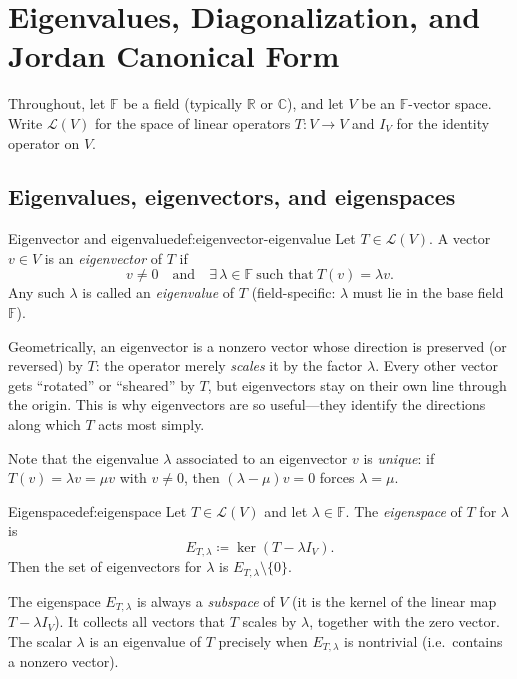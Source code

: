 \section{Eigenvalues, Diagonalization, and Jordan Canonical Form}

Throughout, let $\mathbb{F}$ be a field (typically $\mathbb{R}$ or $\mathbb{C}$), and let $V$ be an $\mathbb{F}$-vector space. Write $\mathcal{L}(V)$ for the space of linear operators $T:V\to V$ and $I_V$ for the identity operator on $V$.

\subsection{Eigenvalues, eigenvectors, and eigenspaces}

\begin{definition}{Eigenvector and eigenvalue}{def:eigenvector-eigenvalue}
Let $T\in\mathcal{L}(V)$. A vector $v\in V$ is an \emph{eigenvector} of $T$ if
\[
v\neq 0 \quad\text{and}\quad \exists\,\lambda\in\mathbb{F}\ \text{such that}\ T(v)=\lambda v.
\]
Any such $\lambda$ is called an \emph{eigenvalue} of $T$ (field-specific: $\lambda$ must lie in the base field $\mathbb{F}$).
\end{definition}

Geometrically, an eigenvector is a nonzero vector whose direction is preserved (or reversed) by $T$: the operator merely \emph{scales} it by the factor $\lambda$.
Every other vector gets ``rotated'' or ``sheared'' by $T$, but eigenvectors stay on their own line through the origin.
This is why eigenvectors are so useful---they identify the directions along which $T$ acts most simply.

Note that the eigenvalue $\lambda$ associated to an eigenvector $v$ is \emph{unique}: if $T(v)=\lambda v=\mu v$ with $v\neq 0$, then $(\lambda-\mu)v=0$ forces $\lambda=\mu$.

\begin{definition}{Eigenspace}{def:eigenspace}
Let $T\in\mathcal{L}(V)$ and let $\lambda\in\mathbb{F}$. The \emph{eigenspace} of $T$ for $\lambda$ is
\[
E_{T,\lambda}\coloneqq \ker(T-\lambda I_V).
\]
Then the set of eigenvectors for $\lambda$ is $E_{T,\lambda}\setminus\{0\}$.
\end{definition}

The eigenspace $E_{T,\lambda}$ is always a \emph{subspace} of $V$ (it is the kernel of the linear map $T-\lambda I_V$).
It collects all vectors that $T$ scales by $\lambda$, together with the zero vector.
The scalar $\lambda$ is an eigenvalue of $T$ precisely when $E_{T,\lambda}$ is nontrivial (i.e.\ contains a nonzero vector).

